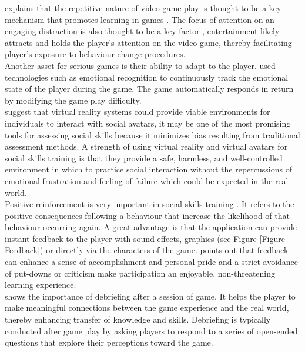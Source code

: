 \documentclass[11pt]{article}
\begin{document}
\citeauthor{Kato12} explains that the repetitive nature of video game play is thought to be a key mechanism that promotes learning in games . The focus of attention on an engaging distraction is also thought to be a key factor \citep{Thompson10}, entertainment likely attracts and holds the player's attention on the video game, thereby facilitating player's exposure to behaviour change procedures. \\

Another asset for serious games is their ability to adapt to the player. \citeauthor{Fernandez12} used technologies such as emotional recognition to continuously track the emotional state of the player during the game. The game automatically responds in return by modifying the game play difficulty. \\

\citeauthor{Kim11} suggest that virtual reality systems could provide viable environments for individuals to interact with social avatars, it may be one of the most promising tools for assessing social skills because it minimizes bias resulting from traditional assessment methods. A strength of using virtual reality and virtual avatars for social skills training is that they provide a safe, harmless, and well-controlled environment in which to practice social interaction without the repercussions of emotional frustration and feeling of failure which could be expected in the real world.\\

Positive reinforcement is very important in social skills training \citep{Bellack04}. It refers to the positive consequences following a behaviour that increase the likelihood of that behaviour occurring again. A great advantage is that the application can provide instant feedback to the player with sound effects, graphics (see Figure \ref{Figure Feedback}) or directly via the characters of the game. \citeauthor{Bellack04} points out that feedback can enhance a sense of accomplishment and personal pride and a strict avoidance of put-downs or criticism make participation an enjoyable, non-threatening learning experience.\\

\citeauthor{Thompson10} shows the importance of debriefing after a session of game. It helps the player to make meaningful connections between the game experience and the real world, thereby enhancing transfer of knowledge and skills. Debriefing is typically conducted after game play by asking players to respond to a series of open-ended questions that explore their perceptions toward the game.\\
\end{document}
